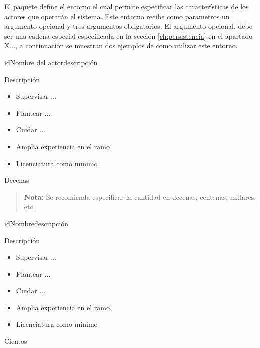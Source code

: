 El paquete define el entorno  el cual permite especificar las características de los actores que operarán el sistema. Este entorno recibe como parametros un argumento opcional y tres argumentos obligatorios. El argumento opcional, debe ser una cadena especial específicada en la sección \ref{ch:persistencia} en el apartado X..., a continuación se muestran dos ejemplos de como utilizar este entorno.

    \begin{code}
 \begin{Actor}{id}{Nombre del actor}{descripción}
     \item[Área:] Descripción
     \item[Responsabilidades:] \hfill
        \begin{itemize}
            \item Supervisar ...
            \item Plantear ...
            \item Cuidar ...
        \end{itemize}
    \item[Perfil:] \hfill
        \begin{itemize}
            \item Amplia experiencia en el ramo
            \item Licenciatura como mínimo
        \end{itemize}
     \item[Cantidad:] Decenas
 \end{Actor}
    \end{code}
    
\begin{quote}
{\bf Nota:} Se recomienda especificar la cantidad en decenas, centenas, millares, etc.
\end{quote}
    
    \begin{code}
 \begin{Actor}{id}{Nombre}{descripción}
     \item[Área:] Descripción
     \item[Responsabilidades:] \hfill
        \begin{itemize}
            \item Supervisar ...
            \item Plantear ...
            \item Cuidar ...
        \end{itemize}
    \item[Perfil:] \hfill
        \begin{itemize}
            \item Amplia experiencia en el ramo
            \item Licenciatura como mínimo
        \end{itemize}
     \item[Cantidad:] Cientos
 \end{Actor}
    \end{code}

